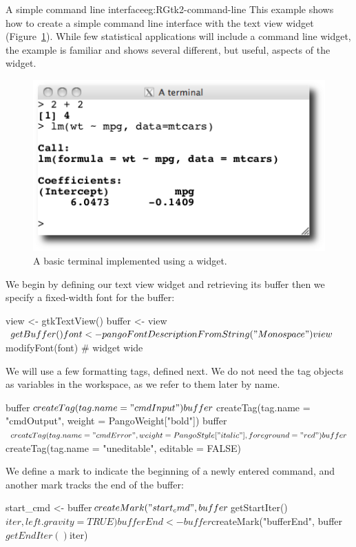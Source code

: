 \begin{example}{A simple command line interface}{eg:RGtk2-command-line}
This example shows how to create a simple command line interface with
the text view widget (Figure~\ref{fig:RGtk2-terminal}). While few statistical applications will include
a command line widget, the example is familiar and shows several
different, but useful, aspects of the widget.

\begin{figure}
  \centering
  \includegraphics[width=.6\textwidth]{ex-RGtk2-terminal}
  \caption{A basic \R\/ terminal implemented using a  widget.}
  \label{fig:RGtk2-terminal}
\end{figure}


We begin by defining our text view widget and retrieving its
buffer then we specify a fixed-width font for the buffer:
\begin{Schunk}
\begin{Sinput}
 view <- gtkTextView()
 buffer <- view$getBuffer()
 font <- pangoFontDescriptionFromString("Monospace")
 view$modifyFont(font)                     # widget wide
\end{Sinput}
\end{Schunk}

We will use a few formatting tags, defined next. We do not need the
tag objects as variables in the workspace, as we refer to them later
by name.
\begin{Schunk}
\begin{Sinput}
 buffer$createTag(tag.name = "cmdInput")
 buffer$createTag(tag.name = "cmdOutput", 
                  weight = PangoWeight["bold"])
 buffer$createTag(tag.name = "cmdError", 
        weight = PangoStyle["italic"], foreground = "red")
 buffer$createTag(tag.name = "uneditable", editable = FALSE)
\end{Sinput}
\end{Schunk}

We define a mark to indicate the beginning of a newly entered
command, and another mark tracks the end of the buffer:
\begin{Schunk}
\begin{Sinput}
 start_cmd <- buffer$createMark("start_cmd", 
                               buffer$getStartIter()$iter, 
                               left.gravity = TRUE)
 bufferEnd <- buffer$createMark("bufferEnd", 
                                buffer$getEndIter()$iter)
\end{Sinput}
\end{Schunk}



\end{example}
